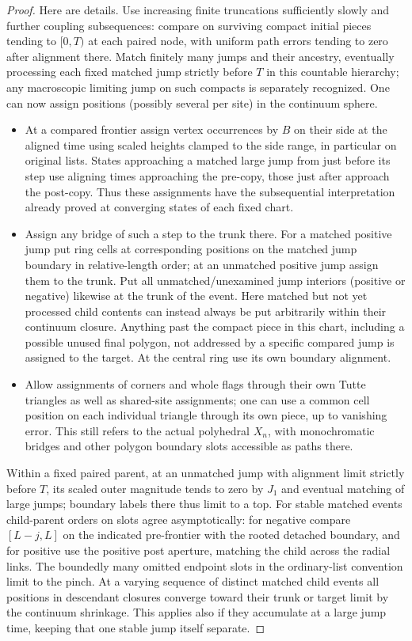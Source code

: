 \begin{proof}
Here are details.
Use increasing finite truncations sufficiently slowly and further coupling subsequences: compare on surviving compact initial pieces tending to \([0,T)\) at each paired node, with uniform path errors tending to zero after alignment there.
Match finitely many jumps and their ancestry, eventually processing each fixed matched jump strictly before \(T\) in this countable hierarchy; any macroscopic limiting jump on such compacts is separately recognized.
One can now assign positions (possibly several per site) in the continuum sphere.
\begin{itemize}
\item At a compared frontier assign vertex occurrences by \(B\) on their side at the aligned time using scaled heights clamped to the side range, in particular on original lists. States approaching a matched large jump from just before its step use aligning times approaching the pre-copy, those just after approach the post-copy. Thus these assignments have the subsequential interpretation already proved at converging states of each fixed chart.
\item Assign any bridge of such a step to the trunk there.
For a matched positive jump put ring cells at corresponding positions on the matched jump boundary in relative-length order; at an unmatched positive jump assign them to the trunk.
Put all unmatched/unexamined jump interiors (positive or negative) likewise at the trunk of the event.
Here matched but not yet processed child contents can instead always be put arbitrarily within their continuum closure.
Anything past the compact piece in this chart, including a possible unused final polygon, not addressed by a specific compared jump is assigned to the target.
At the central ring use its own boundary alignment.
\item Allow assignments of corners and whole flags through their own Tutte triangles as well as shared-site assignments; one can use a common cell position on each individual triangle through its own piece, up to vanishing error. This still refers to the actual polyhedral \(X_n\), with monochromatic bridges and other polygon boundary slots accessible as paths there.
\end{itemize}

Within a fixed paired parent, at an unmatched jump with alignment limit strictly before \(T\), its scaled outer magnitude tends to zero by \(J_1\) and eventual matching of large jumps; boundary labels there thus limit to a top.
For stable matched events child-parent orders on slots agree asymptotically: for negative compare \([L-j,L]\) on the indicated pre-frontier with the rooted detached boundary, and for positive use the positive post aperture, matching the child across the radial links.
The boundedly many omitted endpoint slots in the ordinary-list convention limit to the pinch.
At a varying sequence of distinct matched child events all positions in descendant closures converge toward their trunk or target limit by the continuum shrinkage.
This applies also if they accumulate at a large jump time, keeping that one stable jump itself separate.


\end{proof}

